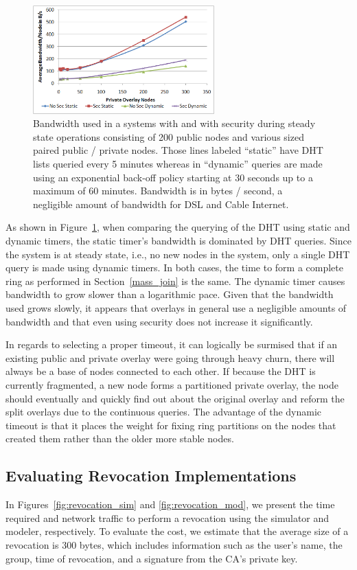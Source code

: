 \documentclass[conference]{IEEEtran}
\begin{document}
\begin{figure}[h]
\centering
\includegraphics[width=2.75in]{bandwidth.eps}
\caption{Bandwidth used in a systems with and with security during steady state
operations consisting of 200 public nodes and various sized paired public /
private nodes.  Those lines labeled ``static'' have DHT lists queried every 5
minutes whereas in ``dynamic'' queries are made using an exponential back-off
policy starting at 30 seconds up to a maximum of 60 minutes.  Bandwidth
is in bytes / second, a negligible amount of bandwidth for DSL and Cable
Internet.}
\label{fig:bandwidth}
\end{figure}

As shown in Figure~\ref{fig:bandwidth}, when comparing the querying of the DHT
using static and dynamic timers, the static timer's bandwidth is dominated by
DHT queries.  Since the system is at steady state, i.e., no new nodes in the
system, only a single DHT query is made using dynamic timers.  In both cases,
the time to form a complete ring as performed in Section~\ref{mass_join} is the
same. The dynamic timer causes bandwidth to grow slower than a logarithmic pace.
Given that the bandwidth used grows slowly, it appears that overlays in general
use a negligible amounts of bandwidth and that even using security does not
increase it significantly.

In regards to selecting a proper timeout, it can logically be surmised that
if an existing public and private overlay were going through heavy churn,
there will always be a base of nodes connected to each other.  If because the DHT
is currently fragmented, a new node forms a partitioned private overlay, the node
should eventually and quickly find out about the original overlay and reform
the split overlays due to the continuous queries.  The advantage of the dynamic
timeout is that it places the weight for fixing ring partitions
on the nodes that created them rather than the older more stable nodes. 

\subsection{Evaluating Revocation Implementations}
\label{evaluation_revocation}
In Figures~\ref{fig:revocation_sim} and \ref{fig:revocation_mod}, we present
the time required and network traffic to perform a revocation using the simulator
and modeler, respectively.  To evaluate the cost, we estimate that the average
size of a revocation is 300 bytes, which includes information such as the user's
name, the group, time of revocation, and a signature from the CA's private key.
\end{document}
